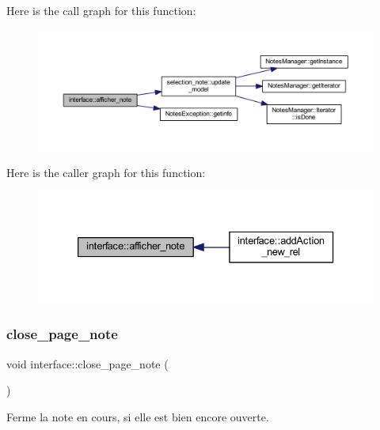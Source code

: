 Here is the call graph for this function\+:\nopagebreak
\begin{figure}[H]
\begin{center}
\leavevmode
\includegraphics[width=350pt]{classinterface_a320051a7a36aa24f53b12df82649f15f_cgraph}
\end{center}
\end{figure}
Here is the caller graph for this function\+:\nopagebreak
\begin{figure}[H]
\begin{center}
\leavevmode
\includegraphics[width=333pt]{classinterface_a320051a7a36aa24f53b12df82649f15f_icgraph}
\end{center}
\end{figure}
\mbox{\label{classinterface_abe2464522932a5d8ed76d1ba02c9d2c6}} 
\subsubsection{\texorpdfstring{close\+\_\+page\+\_\+note}{close\_page\_note}}
{\footnotesize\ttfamily void interface\+::close\+\_\+page\+\_\+note (\begin{DoxyParamCaption}{ }\end{DoxyParamCaption})\hspace{0.3cm}{\ttfamily [slot]}}



Ferme la note en cours, si elle est bien encore ouverte. 

